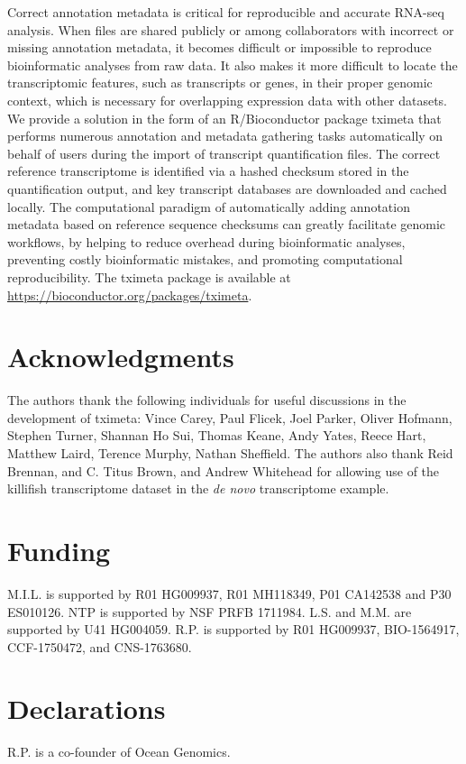 \documentclass[10pt,letterpaper]{article}
\begin{document}
Correct annotation metadata is critical for reproducible and accurate
RNA-seq analysis. When files are shared publicly or among
collaborators with incorrect or missing annotation metadata, it
becomes difficult or impossible to reproduce bioinformatic analyses
from raw data. It also makes it more difficult to locate the
transcriptomic features, such as transcripts or genes, in their proper
genomic context, which is necessary for overlapping expression data
with other datasets. We provide a solution in the form of an
R/Bioconductor package tximeta that performs numerous annotation and
metadata gathering tasks automatically on behalf of users during the
import of transcript quantification files. The correct reference
transcriptome is identified via a hashed checksum stored in the
quantification output, and key transcript databases are downloaded and
cached locally. The computational paradigm of automatically adding
annotation metadata based on reference sequence checksums can greatly
facilitate genomic workflows, by helping to reduce overhead during
bioinformatic analyses, preventing costly bioinformatic mistakes, and
promoting computational reproducibility.
The tximeta package is
available at \url{https://bioconductor.org/packages/tximeta}.

\linenumbers



\section*{Acknowledgments}

The authors thank the following individuals for useful discussions 
in the development of tximeta: Vince Carey, Paul Flicek, Joel Parker,
Oliver Hofmann, Stephen Turner, Shannan Ho Sui, Thomas Keane, Andy
Yates, Reece Hart, Matthew Laird, Terence Murphy, Nathan Sheffield.
The authors also thank Reid Brennan, and C. Titus Brown, and Andrew
Whitehead for allowing use of the killifish transcriptome dataset in
the \textit{de novo} transcriptome example.

\section*{Funding}

M.I.L. is supported by R01 HG009937, R01 MH118349, P01 CA142538 and
P30 ES010126.
NTP is supported by NSF PRFB 1711984.
L.S. and M.M. are supported by U41 HG004059.
R.P. is supported by R01 HG009937, BIO-1564917, CCF-1750472, and
CNS-1763680. 

\section*{Declarations}

R.P. is a co-founder of Ocean Genomics.

\nolinenumbers


\end{document}
